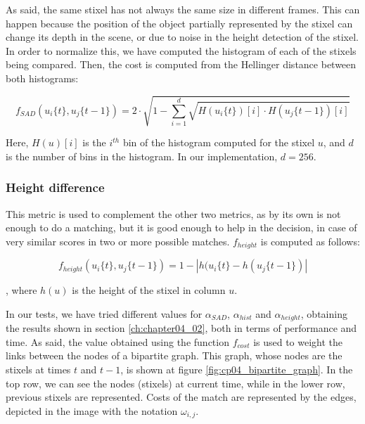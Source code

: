 As said, the same stixel has not always the same size in different frames. This can happen because the position of the object partially represented by the stixel can change its depth in the scene, or due to noise in the height detection of the stixel. In order to normalize this, we have computed the histogram of each of the stixels being compared. Then, the cost is computed from the Hellinger distance between both histograms:

\begin{equation}\label{eq:cp04_stixel_movement_histograms_cost}
f_{SAD}(u_i\{t\}, u_j\{t - 1\}) = 2 \cdot \sqrt { 1 - \underset{i=1}{\overset{d}{\sum}}\sqrt{H(u_i\{t\})[i] \cdot H(u_j\{t - 1\})[i]}}
\end{equation}

Here, $H(u)[i]$ is the $i^{th}$ bin of the histogram computed for the stixel $u$, and $d$ is the number of bins in the histogram. In our implementation, $d = 256$.

\subsubsection{Height difference}\label{ch:chapter04_01_03_01_05}

This metric is used to complement the other two metrics, as by its own is not enough to do a matching, but it is good enough to help in the decision, in case of very similar scores in two or more possible matches. $f_{height}$ is computed as follows:

\begin{equation}\label{eq:cp04_stixel_movement_height_cost}
f_{height}(u_i\{t\}, u_j\{t - 1\}) = 1 - |h(u_i\{t\} - h(u_j\{t - 1\})|
\end{equation}

, where $h(u)$ is the height of the stixel in column $u$. 

In our tests, we have tried different values for $\alpha_{SAD}$, $\alpha_{hist}$ and $\alpha_{height}$, obtaining the results shown in section \ref{ch:chapter04_02}, both in terms of performance and time. As said, the value obtained using the function $f_{cost}$ is used to weight the links between the nodes of a bipartite graph. This graph, whose nodes are the stixels at times $t$ and $t - 1$, is shown at figure \ref{fig:cp04_bipartite_graph}. In the top row, we can see the nodes (stixels) at current time, while in the lower row, previous stixels are represented. Costs of the match are represented by the edges, depicted in the image with the notation $\omega_{i,j}$.

